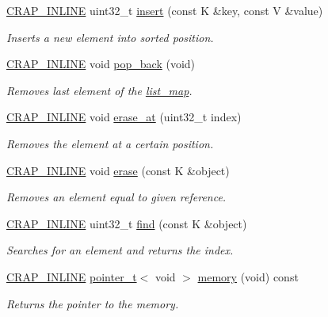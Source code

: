 \begin{DoxyCompactItemize}
\hyperlink{config__x86_8h_a5a40526b8d842e7ff731509998bb0f1c}{C\+R\+A\+P\+\_\+\+I\+N\+L\+I\+N\+E} uint32\+\_\+t \hyperlink{classcrap_1_1list__map_a161f78e4bf22381465d7627ee3c32ad6}{insert} (const K \&key, const V \&value)
\begin{DoxyCompactList}\small\item\em Inserts a new element into sorted position. \end{DoxyCompactList}\item 
\hyperlink{config__x86_8h_a5a40526b8d842e7ff731509998bb0f1c}{C\+R\+A\+P\+\_\+\+I\+N\+L\+I\+N\+E} void \hyperlink{classcrap_1_1list__map_a10117ed620db31785461faed6e4d75ad}{pop\+\_\+back} (void)
\begin{DoxyCompactList}\small\item\em Removes last element of the \hyperlink{classcrap_1_1list__map}{list\+\_\+map}. \end{DoxyCompactList}\item 
\hyperlink{config__x86_8h_a5a40526b8d842e7ff731509998bb0f1c}{C\+R\+A\+P\+\_\+\+I\+N\+L\+I\+N\+E} void \hyperlink{classcrap_1_1list__map_ab475c0d5d30a2e1b8dce49069a3fdf3b}{erase\+\_\+at} (uint32\+\_\+t index)
\begin{DoxyCompactList}\small\item\em Removes the element at a certain position. \end{DoxyCompactList}\item 
\hyperlink{config__x86_8h_a5a40526b8d842e7ff731509998bb0f1c}{C\+R\+A\+P\+\_\+\+I\+N\+L\+I\+N\+E} void \hyperlink{classcrap_1_1list__map_af06978dff9d248f3408141bd88633db8}{erase} (const K \&object)
\begin{DoxyCompactList}\small\item\em Removes an element equal to given reference. \end{DoxyCompactList}\item 
\hyperlink{config__x86_8h_a5a40526b8d842e7ff731509998bb0f1c}{C\+R\+A\+P\+\_\+\+I\+N\+L\+I\+N\+E} uint32\+\_\+t \hyperlink{classcrap_1_1list__map_ab3aa606c656a001465e21c59c891f234}{find} (const K \&object)
\begin{DoxyCompactList}\small\item\em Searches for an element and returns the index. \end{DoxyCompactList}\item 
\hyperlink{config__x86_8h_a5a40526b8d842e7ff731509998bb0f1c}{C\+R\+A\+P\+\_\+\+I\+N\+L\+I\+N\+E} \hyperlink{structcrap_1_1pointer__t}{pointer\+\_\+t}$<$ void $>$ \hyperlink{classcrap_1_1list__map_a50b3ec15975187ab5f0ec62104b2b4a0}{memory} (void) const 
\begin{DoxyCompactList}\small\item\em Returns the pointer to the memory. \end{DoxyCompactList}\end{DoxyCompactItemize}
